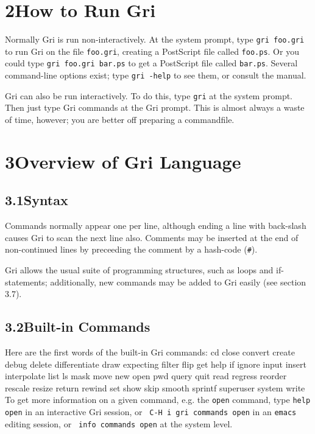 \section{2\quad How to Run Gri}
Normally Gri is run non-interactively.  At the system prompt, type
{\tt gri foo.gri} to run Gri on the file {\tt foo.gri}, creating a
PostScript file called {\tt foo.ps}.  Or you could type {\tt gri
foo.gri bar.ps} to get a PostScript file called {\tt bar.ps}.  Several
command-line options exist; type {\tt gri -help} to see them, or
consult the manual.

Gri can also be run interactively.  To do this, type {\tt gri} at the
system prompt.  Then just type Gri commands at the Gri prompt.  This
is almost always a waste of time, however; you are better off
preparing a commandfile.



\section{3\quad Overview of Gri Language}
\subsection{3.1\quad Syntax}
Commands normally appear one per line, although ending a line with
back-slash causes Gri to scan the next line also.  Comments may be
inserted at the end of non-continued lines by preceeding the comment
by a hash-code ({\tt \#}).

Gri allows the usual suite of programming structures, such as loops
and if-statements; additionally, new commands may be added to Gri
easily (see section 3.7).

\subsection{3.2\quad Built-in Commands}

Here are the first words of the built-in Gri commands:
\beginexample
cd      close         convert     create    debug
delete  differentiate draw        expecting filter
flip    get           help        if        ignore
input   insert        interpolate list      ls
mask    move          new         open      pwd
query   quit          read        regress   reorder
rescale resize        return      rewind    set
show    skip          smooth      sprintf   superuser
system  write
\endexample
To get more information on a given command, e.g. the {\tt open}
command, type {\tt help open} in an interactive Gri session, or {\tt
C-H i gri commands open} in an {\tt emacs} editing session, or {\tt
info commands open} at the system level.


